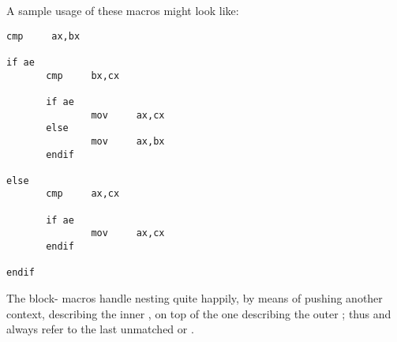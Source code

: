 A sample usage of these macros might look like:

\begin{lstlisting}
cmp     ax,bx

if ae
       cmp     bx,cx

       if ae
               mov     ax,cx
       else
               mov     ax,bx
       endif

else
       cmp     ax,cx

       if ae
               mov     ax,cx
       endif

endif
\end{lstlisting}

The block- macros handle nesting quite happily, by means of
pushing another context, describing the inner , on top of the
one describing the outer ; thus  and 
always refer to the last unmatched  or .
